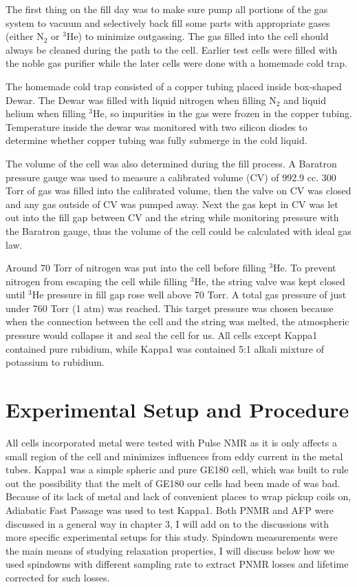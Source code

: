 The first thing on the fill day was to make sure pump all portions of the gas system to vacuum and selectively back fill some parts with appropriate gases (either N$_2$ or $^{3}$He) to minimize outgassing. The gas filled into the cell should always be cleaned during the path to the cell. Earlier test cells were filled with the noble gas purifier while the later cells were done with a homemade cold trap.

The homemade cold trap consisted of a copper tubing placed inside box-shaped Dewar. The Dewar was filled with liquid nitrogen when filling N$_2$ and liquid helium when filling $^{3}$He, so impurities in the gas were frozen in the copper tubing. Temperature inside the dewar was monitored with two silicon diodes to determine whether copper tubing was fully submerge in the cold liquid.

The volume of the cell was also determined during the fill process. A Baratron pressure gauge was used to measure a calibrated volume (CV) of 992.9 cc. 300 Torr of gas was filled into the calibrated volume, then the valve on CV was closed and any gas outside of CV was pumped away. Next the gas kept in CV was let out into the fill gap between CV and the string while monitoring pressure with the Baratron gauge, thus the volume of the cell could be calculated with ideal gas law.

Around 70 Torr of nitrogen was put into the cell before filling $^{3}$He. To prevent nitrogen from escaping the cell while filling $^{3}$He, the string valve was kept closed until $^{3}$He pressure in fill gap rose well above 70 Torr. A total gas pressure of just under 760 Torr (1 atm) was reached. This target pressure was chosen because when the connection between the cell and the string was melted, the atmospheric pressure would collapse it and seal the cell for us. All cells except Kappa1 contained pure rubidium, while Kappa1 was contained 5:1 alkali mixture of potassium to rubidium.

\section{Experimental Setup and Procedure}

All cells incorporated metal were tested with Pulse NMR as it is only affects a small region of the cell and minimizes influences from eddy current in the metal tubes. Kappa1 was a simple spheric and pure GE180 cell, which was built to rule out the possibility that the melt of GE180 our cells had been made of was bad. Because of its lack of metal and lack of convenient places to wrap pickup coils on, Adiabatic Fast Passage was used to test Kappa1. Both PNMR and AFP were discussed in a general way in chapter 3, I will add on to the discussions with more specific experimental setups for this study. Spindown measurements were the main means of studying relaxation properties, I will discuss below how we used spindowns with different sampling rate to extract PNMR losses and lifetime corrected for such losses.

